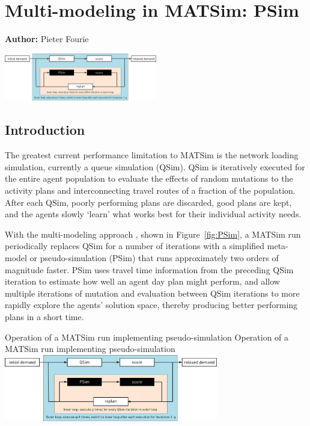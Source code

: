 \chapter{Multi-modeling in MATSim: PSim}
\label{ch:psim}

\hfill \textbf{Author:} Pieter Fourie

\begin{center} \includegraphics[width=0.5\textwidth, angle=0]{extending/figures/PSim/psim.pdf} \end{center}


\section{Introduction}
The greatest current performance limitation to MATSim is the network loading simulation, currently a queue simulation (QSim). QSim is iteratively executed for the entire agent population to evaluate the effects of random mutations to the activity plans and interconnecting travel routes of a fraction of the population. After each QSim, poorly performing plans are discarded, good plans are kept, and the agents slowly ‘learn’ what works best for their individual activity needs. 

With the multi-modeling approach \citep[][]{FourieEtAl_TRR_2013}, shown in Figure~\ref{fig:PSim}, a MATSim run periodically replaces QSim for a number of iterations with a simplified meta-model or pseudo-simulation (PSim) that runs approximately two orders of magnitude faster. PSim uses travel time information from the preceding QSim iteration to estimate how well an agent day plan might perform, and allow multiple iterations of mutation and evaluation between QSim iterations to more rapidly explore the agents' solution space, thereby producing better performing plans in a short time.

\createfigure%
{Operation of a MATSim run implementing pseudo-simulation}%
{Operation of a MATSim run implementing pseudo-simulation}%
{\label{fig:PSim}}%
{\includegraphics[width=0.7\textwidth, angle=0]{extending/figures/PSim/psim.pdf}}%
{}

